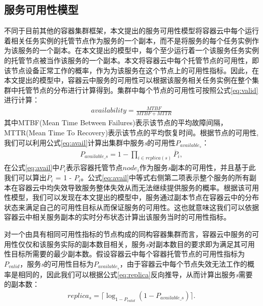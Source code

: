 \subsection{服务可用性模型}\label{sec:availability_model}
不同于目前其他的容器集群框架，本文提出的服务可用性模型将容器云中每个运行着相关任务实例的托管节点作为服务的一个副本，而不是将服务的每个任务实例作为该服务的一个副本。在本文提出的模型中，每个至少运行着一个该服务任务实例的托管节点被当作该服务的一个副本。本文将容器云中每个托管节点的可用性，即该节点设备正常工作的概率，作为为该服务在这个节点上的可用性指标。因此，在本文提出的模型中，容器云中服务的可用性可以根据该服务相关任务实例在整个集群中托管节点的分布进行计算得到。集群中每个节点的可用性可按照公式\ref{eq:valid}进行计算：
\begin{equation}\label{eq:valid}
\begin{split}
availability = \frac{MTBF}{MTBF + MTTR}
\end{split}
\end{equation}
其中MTBF(Mean Time Between Failures)表示该节点的平均故障间隔，MTTR(Mean Time To Recovery)表示该节点的平均恢复时间。根据节点的可用性, 我们可以利用公式\ref{eq:avail}计算出集群中服务\emph{s}的可用性$P_{available_s}$：
\begin{equation}\label{eq:avail}
\begin{split}
P_{available\_s} = 1 - \prod_{i \in {replica(s)}} \overline P_{i},
\end{split}
\end{equation}
在公式\ref{eq:avail}中$P_{i}$表示容器托管节点$node_i$作为服务\emph{s}副本的可用性，并且基于此我们可以算出$\overline P_{i}$ = 1 - $P_{i}$。公式\ref{eq:avail}中等式右侧第二项表示整个服务的所有副本在容器云中均失效导致服务整体失效从而无法继续提供服务的概率。根据该可用性模型，我们可以发现在本文提出的模型中，服务通过副本节点在容器云中的分布状态来满足自己的可用性目标从而保证服务的可用性。这也就意味这我们可以依据容器云中相关服务副本的实时分布状态计算出该服务当时的可用性指标。

对一个由具有相同可用性指标的节点构成的同构容器集群而言，容器云中服务的可用性仅仅和该服务实际的副本数目相关，服务\emph{s}对副本数目的要求即为满足其可用性目标所需要的最少副本数。假设容器云中每个容器托管节点的可用性指标为$P_{valid}$，服务\emph{s}的可用性目标为$P_{available_s}$，由于容器云中每个节点失效无法工作的概率是相同的，因此我们可以根据公式\ref{eq:replica}反向推导，从而计算出服务\emph{s}需要的副本数：
\begin{equation}\label{eq:replica}
\begin{split}
replica_s = \lceil \log_{1-P_{valid}} ( 1 - P_{available\_s} )\rceil.
\end{split}
\end{equation}

